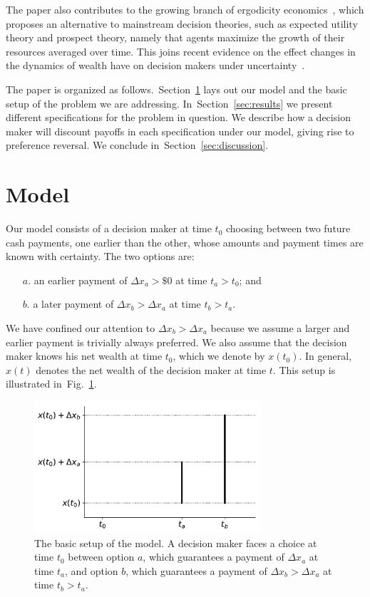 \documentclass[11pt]{article}
\newcommand{\Sref}[1]{Section~\ref{sec:#1}}
\newcommand{\flabel}[1]{\label{fig:#1}}
\newcommand{\fref}[1]{Fig.~\ref{fig:#1}}
\newcommand{\Dx}{\Delta x}
\numberwithin{equation}{section}
\begin{document}
The paper also contributes to the growing branch of ergodicity economics~\citep{peters2016evaluating,berman2016far,peters2018time}, which proposes an alternative to mainstream decision theories, such as expected utility theory and prospect theory, namely that agents maximize the growth of their resources averaged over time. This joins recent evidence on the effect changes in the dynamics of wealth have on decision makers under uncertainty~\citep{hulme2019unpublished}.

The paper is organized as follows.~\Sref{model} lays out our model and the basic setup of the problem we are addressing. In~\Sref{results} we present different specifications for the problem in question. We describe how a decision maker will discount payoffs in each specification under our model, giving rise to preference reversal. We conclude in~\Sref{discussion}.

\section{Model}\label{sec:model}

Our model consists of a decision maker at time $t_0$ choosing between two future cash payments, one earlier than the other, whose amounts and payment times are known with certainty. The two options are:
\begin{enumerate}
\item[$a$.] an earlier payment of $\Dx_a>\$ 0$ at time $t_a>t_0$; and
\item[$b$.] a later payment of $\Dx_b>\Dx_a$ at time $t_b>t_a$.
\end{enumerate}
We have confined our attention to $\Dx_b>\Dx_a$ because we assume a larger and earlier payment is trivially always preferred. We also assume that the decision maker knows his net wealth at time $t_0$, which we denote by $x\left(t_0\right)$. In general, $x\left(t\right)$ denotes the net wealth of the decision maker at time $t$. This setup is illustrated in~\fref{basicsetup}.

\begin{figure}[!htb]
\centering
\includegraphics[width=0.75\textwidth]{./figures/setup.pdf}
\caption{
The basic setup of the model. A decision maker faces a choice at time $t_0$ between option $a$, which guarantees a payment of $\Dx_a$ at time $t_a$, and option $b$, which guarantees a payment of $\Dx_b>\Dx_a$ at time $t_b>t_a$.
}
\flabel{basicsetup}
\end{figure}
\end{document}
